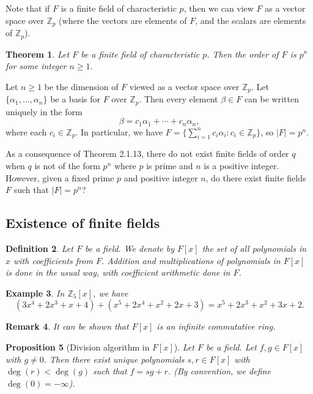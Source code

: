 \documentclass[10pt]{article}
\makeatletter
\newcommand{\Z}{\mathbb{Z}}
\theoremstyle{newstyle}
\newtheorem{thm}{Theorem}[subsection]
\newtheorem{remark}[thm]{Remark}
\newtheorem{prop}[thm]{Proposition}
\newtheorem{defn}[thm]{Definition}
\newtheorem{exmp}[thm]{Example}
\newenvironment{pf}[1][\proofname]{\par
  \pushQED{\qed}%
  \normalfont \topsep0\p@\relax
  \trivlist
  \item[\hskip\labelsep\scshape
  #1\@addpunct{.}]\ignorespaces
}{%
  \popQED\endtrivlist\@endpefalse
}
\makeatother
\begin{document}
Note that if $F$ is a finite field of characteristic $p$, then we can view $F$ 
as a vector space over $\Z_p$ (where the vectors are elements of $F$, and the 
scalars are elements of $\Z_p$).

\begin{thm}
Let $F$ be a finite field of characteristic $p$. Then the order of 
$F$ is $p^n$ for some integer $n \geq 1$.
\end{thm}
\begin{pf}
Let $n \geq 1$ be the dimension of $F$ viewed as a vector space over $\Z_p$. 
Let $\{\alpha_1, \dots, \alpha_n\}$ be a basis for $F$ over $\Z_p$. 
Then every element $\beta \in F$ can be written uniquely in the form 
\[ \beta = c_1\alpha_1 + \cdots + c_n\alpha_n, \]
where each $c_i \in \Z_p$. In particular, we have 
$F = \{\sum_{i=1}^n c_i\alpha_i : c_i \in \Z_p\}$, so $|F| = p^n$.
\end{pf}

As a consequence of Theorem 2.1.13, there do not exist finite fields of order $q$ when 
$q$ is not of the form $p^n$ where $p$ is prime and $n$ is a positive integer. 
However, given a fixed prime $p$ and positive integer $n$, do there exist finite fields 
$F$ such that $|F| = p^n$?

\subsection{Existence of finite fields}

\begin{defn}
Let $F$ be a field. We denote by $F[x]$ the set of all polynomials in $x$ with coefficients from $F$. 
Addition and multiplications of polynomials in $F[x]$ is done in the usual way, with 
coefficient arithmetic done in $F$. 
\end{defn}

\begin{exmp}
In $\Z_5[x]$, we have 
\[ (3x^4 + 2x^3 + x + 4) + (x^5 + 2x^4 + x^2 + 2x + 3) = x^5 + 2x^3 + x^2 + 3x + 2. \]
\end{exmp}

\begin{remark}
It can be shown that $F[x]$ is an infinite commutative ring.
\end{remark}

\begin{prop}[Division algorithm in $F{[x]}$]
Let $F$ be a field. Let $f, g \in F[x]$ with $g \neq 0$. Then there exist 
unique polynomials $s, r \in F[x]$ with $\deg(r) < \deg(g)$ such that 
$f = sg+r$. (By convention, we define $\deg(0) = -\infty$).
\end{prop}
\end{document}
